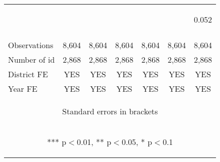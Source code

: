 \begin{center}
\begin{tabular}{lcccccc}
 & \begin{footnotesize}[0.331]\end{footnotesize} & \begin{footnotesize}[0.000]\end{footnotesize} & \begin{footnotesize}[0.000]\end{footnotesize} & \begin{footnotesize}[0.016]\end{footnotesize} & \begin{footnotesize}[0.094]\end{footnotesize} & \begin{footnotesize}0.052\end{footnotesize} \\
\vspace{4pt} & \begin{footnotesize}\end{footnotesize} & \begin{footnotesize}\end{footnotesize} & \begin{footnotesize}\end{footnotesize} & \begin{footnotesize}\end{footnotesize} & \begin{footnotesize}\end{footnotesize} & \begin{footnotesize}\end{footnotesize} \\
Observations & 8,604 & 8,604 & 8,604 & 8,604 & 8,604 & 8,604 \\
Number of id & 2,868 & 2,868 & 2,868 & 2,868 & 2,868 & 2,868 \\
District FE & YES & YES & YES & YES & YES & YES \\
 Year FE & YES & YES & YES & YES & YES & YES \\ \hline
\multicolumn{7}{c}{\begin{footnotesize} Standard errors in brackets\end{footnotesize}} \\
\multicolumn{7}{c}{\begin{footnotesize} *** p$<$0.01, ** p$<$0.05, * p$<$0.1\end{footnotesize}} \\
\end{tabular}
\end{center}
